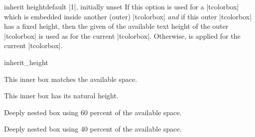\clearpage
\begin{docTcbKey}[][doc new={2017-06-28}]{inherit height}{}{default |1|, initially unset}
  If this option is used for a |tcolorbox| which is embedded inside
  another (outer) |tcolorbox| \emph{and} if this outer |tcolorbox| has
  a fixed height, then the given  of the available text height
  of the outer |tcolorbox| is used as  for the current
  |tcolorbox|.
  Otherwise,  is applied for the current
  |tcolorbox|.

\begin{exdispExample}{inherit_height}

\begin{tcolorbox}[title=Outer box with fixed height 4cm,height=4cm]
  \begin{tcolorbox}[title=Inner box,nobeforeafter,inherit height]
    This inner box matches the available space.
  \end{tcolorbox}
\end{tcolorbox}

\begin{tcolorbox}[title=Outer box with natural height]
  \begin{tcolorbox}[title=Inner box,nobeforeafter,inherit height]
    This inner box has its natural height.
  \end{tcolorbox}
\end{tcolorbox}

\begin{tcolorbox}[title=Outer box with fixed height 5cm,height=5cm]
  \begin{tcolorbox}[title=Inner box,nobeforeafter,inherit height]
    \begin{tcolorbox}[colframe=red,beforeafter skip=0pt,inherit height=0.6]
      Deeply nested box using 60 percent of the available space.
    \end{tcolorbox}
    \begin{tcolorbox}[colframe=red,beforeafter skip=0pt,inherit height=0.4]
      Deeply nested box using 40 percent of the available space.
    \end{tcolorbox}
  \end{tcolorbox}
\end{tcolorbox}
\end{exdispExample}
\end{docTcbKey}


\clearpage


